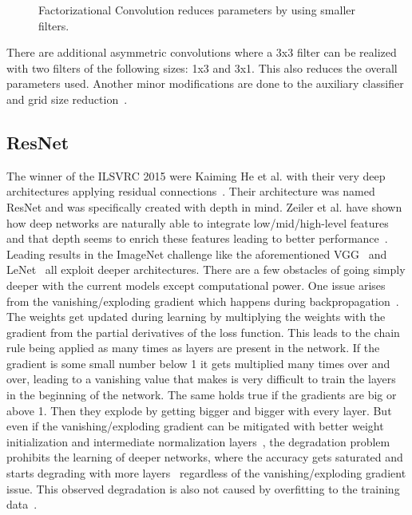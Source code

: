 \begin{figure}[!h]
\centering
\caption{Factorizational Convolution reduces parameters by using smaller filters.}
\label{fig:factorization}
\end{figure}

\quad

There are additional asymmetric convolutions where a 3x3 filter can be realized with two filters of the following sizes: 1x3 and 3x1. This also reduces the overall parameters used. Another minor modifications are done to the auxiliary classifier and grid size reduction~\cite{szegedy2016rethinking}.\\



\subsection{ResNet}

The winner of the ILSVRC 2015 were Kaiming He et al. with their very deep architectures applying residual connections~\cite{he2016deep, he2016identity}. Their architecture was named ResNet and was specifically created with depth in mind. Zeiler et al. have shown how deep networks are naturally able to integrate low/mid/high-level features and that depth seems to enrich these features leading to better performance~\cite{zeiler2014visualizing}. Leading results in the ImageNet challenge like the aforementioned VGG~\cite{simonyan2014very} and LeNet~\cite{szegedy2015going} all exploit deeper architectures. There are a few obstacles of going simply deeper with the current models except computational power. One issue arises from the vanishing/exploding gradient which happens during backpropagation~\cite{glorot2010understanding}. The weights get updated during learning by multiplying the weights with the gradient from the partial derivatives of the loss function. This leads to the chain rule being applied as many times as layers are present in the network. If the gradient is some small number below 1 it gets multiplied many times over and over, leading to a vanishing value that makes is very difficult to train the layers in the beginning of the network. The same holds true if the gradients are big or above 1. Then they explode by getting bigger and bigger with every layer. But even if the vanishing/exploding gradient can be mitigated with better weight initialization and intermediate normalization layers~\cite{ioffe2015batch}, the degradation problem prohibits the learning of deeper networks, where the accuracy gets saturated and starts degrading with more layers~\cite{he2016deep} regardless of the vanishing/exploding gradient issue. This observed degradation is also not caused by overfitting to the training data~\cite{he2015convolutional, srivastava2015highway}.\\

